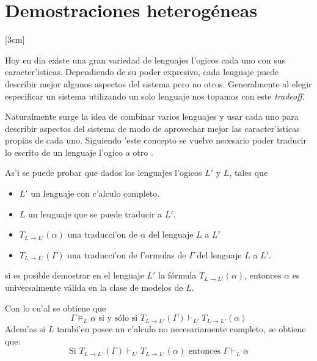 \section{Demostraciones heterogéneas}
\label{heterogenious proofs}

[3cm]

Hoy en dia existe una gran variedad de lenguajes l'ogicos cada uno con sus caracter'isticas. Dependiendo de su poder expresivo, cada lenguaje puede describir mejor algunos aspectos del sistema pero no otros. Generalmente al elegir especificar un sistema utilizando un solo lenguaje nos topamos con este \textit{tradeoff}.

Naturalmente surge la idea de combinar varios lenguajes y usar cada uno para describir aspectos del sistema de modo de aprovechar mejor las caracter'isticas propias de cada uno. Siguiendo 'este concepto se vuelve necesario poder traducir lo escrito de un lenguaje l'ogico a otro \cite{goguen:jacm-39_1,meseguer:lc87,tarlecki:sadt-rtdts95}.

As'i se puede probar que dados los lenguajes l'ogicos $L'$ y $L$, tales que 

\begin{itemize}
\item $L'$ un lenguaje con c'alculo completo. 
\item $L$ un lenguaje que se puede traducir a $L'$.
\item $T_{L \to L'}(\alpha)$ una traducci'on de $\alpha$ del lenguaje $L$ a $L'$ 
\item $T_{L \to L'}(\Gamma)$ una traducci'on de f'ormulas de $\Gamma$ del lenguaje $L$ a $L'$.
\end{itemize}
si es posible demostrar en el lenguaje $L'$ la fórmula $T_{L \to L'} (\alpha)$, entonces $\alpha$ es universalmente válida en la clase de modelos de $L$.

Con lo cu'al se obtiene que
$$\Gamma \models_L \alpha \mbox{ si y sólo si } T_{L \to L'}(\Gamma) \vdash_{L'} T_{L \to L'}(\alpha)$$
Adem'as si $L$ tambi'en posee un c'alculo no necesariamente completo, se obtiene que:
$$\mbox{Si } T_{L \to L'}(\Gamma) \vdash_{L'} T_{L \to L'}(\alpha) \mbox{ entonces } \Gamma \vdash_L \alpha$$

